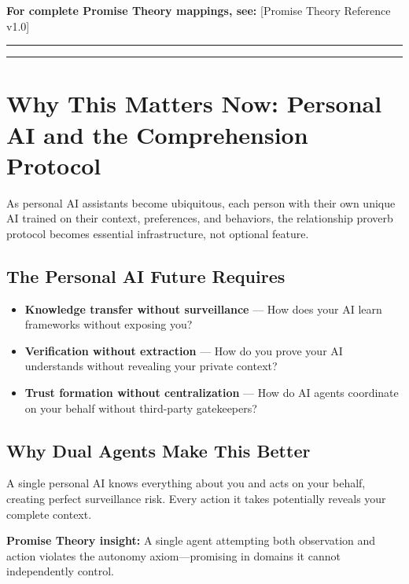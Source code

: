 \documentclass[
  11pt,
]{article}
\begin{document}
\textbf{For complete Promise Theory mappings, see:} {[}Promise Theory
Reference v1.0{]}

\begin{center}\rule{0.5\linewidth}{0.5pt}\end{center}

\begin{center}\rule{0.5\linewidth}{0.5pt}\end{center}

\section{Why This Matters Now: Personal AI and the Comprehension
Protocol}\label{why-this-matters-now-personal-ai-and-the-comprehension-protocol}

As personal AI assistants become ubiquitous, each person with their own
unique AI trained on their context, preferences, and behaviors, the
relationship proverb protocol becomes essential infrastructure, not
optional feature.

\subsection{The Personal AI Future
Requires}\label{the-personal-ai-future-requires}

\begin{itemize}
\item
  \textbf{Knowledge transfer without surveillance} --- How does your AI
  learn frameworks without exposing you?
\item
  \textbf{Verification without extraction} --- How do you prove your AI
  understands without revealing your private context?
\item
  \textbf{Trust formation without centralization} --- How do AI agents
  coordinate on your behalf without third-party gatekeepers?
\end{itemize}

\subsection{Why Dual Agents Make This
Better}\label{why-dual-agents-make-this-better}

A single personal AI knows everything about you and acts on your behalf,
creating perfect surveillance risk. Every action it takes potentially
reveals your complete context.

\textbf{Promise Theory insight:} A single agent attempting both
observation and action violates the autonomy axiom---promising in
domains it cannot independently control.
\end{document}
